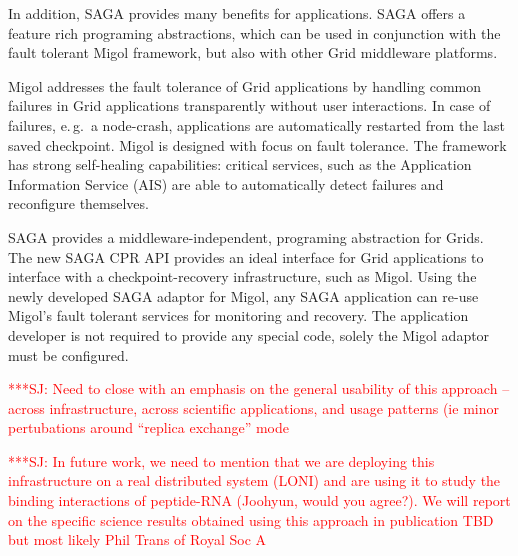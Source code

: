 \documentclass[times, 10pt,twocolumn]{article}
\newcommand{\jhanote}[1]{ {\textcolor{red} { ***SJ: #1 }}}
\begin{document}
In addition, SAGA provides many benefits for applications.  SAGA offers a feature rich programing abstractions, which can be used in conjunction with the fault tolerant Migol framework, but also with other Grid middleware platforms.




Migol addresses the fault tolerance of Grid applications by handling common failures 
in Grid applications transparently without user interactions.  In case of failures, 
e.\,g.\ a node-crash, applications are automatically restarted 
from the last saved checkpoint.   
Migol is designed with focus on fault tolerance. 
The framework has strong self-healing capabilities: critical services, 
such as the Application Information Service (AIS) are
able to automatically detect failures and reconfigure themselves. 

SAGA provides a middleware-independent, programing abstraction for Grids. The new 
SAGA CPR API provides an ideal interface for Grid applications to interface with 
a checkpoint-recovery infrastructure, such as Migol. Using the newly developed SAGA adaptor for 
Migol, any SAGA application can re-use Migol's fault tolerant services for monitoring and recovery.
The application developer is not required to provide any special code, solely the Migol adaptor must be
configured.

\jhanote{Need to close with an emphasis on the general usability of
  this approach -- across infrastructure, across scientific
  applications, and usage patterns (ie minor pertubations around
  ``replica exchange'' mode}

\jhanote{In future work, we need to mention that we are deploying this
  infrastructure on a real distributed system (LONI) and are using it
  to study the binding interactions of peptide-RNA (Joohyun, would you
  agree?). We will report on the specific science results obtained
  using this approach in publication TBD but most likely Phil Trans of
  Royal Soc A}



\end{document}
